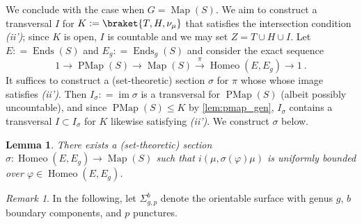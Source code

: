 \documentclass[twoside]{amsart}
\theoremstyle{plain}
\newtheorem{lemma}[theorem]{Lemma}
\theoremstyle{break}
\theoremstyle{definition}
\theoremstyle{remark}
\newtheorem*{remark}{Remark}
\newcommand{\dfn}{\mathrel{\mathop:}=}
\DeclareMathOperator{\img}{im}
\DeclareMathOperator{\Map}{Map}
\DeclareMathOperator{\Homeo}{Homeo}
\DeclareMathOperator{\Ends}{Ends}
\DeclareMathOperator{\PMap}{PMap}
\begin{document}
We conclude with the case when $G = \Map(S)$. We aim to construct a
transversal 
$I$ for $K \dfn \braket{T,H,\nu_\mu}$ that satisfies
the intersection condition \textit{(ii')}; since $K$ is open, $I$ is countable and we may set
$Z = T \cup H \cup I$. Let $E \dfn\Ends(S)$ and $E_g \dfn \Ends_g(S)$
and consider the exact sequence
\[
1\rightarrow\PMap(S)\rightarrow\Map(S)\xrightarrow{\pi}\Homeo(E,E_g)
\rightarrow 1 \:.
\]
It suffices to construct a (set-theoretic) section $\sigma$ for $\pi$ whose
whose image satisfies \textit{(ii')}.  Then $I_\sigma \dfn \img
\sigma$ is a transversal for $\PMap(S)$ (albeit possibly
uncountable), and since $\PMap(S) \leq K$
by \cref{lem:pmap_gen}, $I_\sigma$ contains a transversal $I \subset
I_\sigma$ for $K$ likewise satisfying \textit{(ii')}.
We construct $\sigma$ below.


\begin{lemma}\label{lem:end_section}
  There exists a (set-theoretic) section $\sigma :
  \Homeo(E,E_g) \to
  \Map(S)$ such that $i(\mu,\sigma(\varphi)\mu)$ is uniformly
  bounded over $\varphi \in \Homeo(E,E_g)$.
\end{lemma}

\begin{remark}
  In the following, let $\Sigma^b_{g,p}$ denote the orientable
  surface with genus $g$, $b$ boundary components, and $p$
  punctures.
\end{remark}
\end{document}

